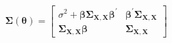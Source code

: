 \begin{equation}
	\boldsymbol{\Sigma} \left( \boldsymbol{\theta} \right)
	=
	\left[
		\begin{array}{c|c}
			\sigma^2 + \boldsymbol{\beta} \boldsymbol{\Sigma}_{\mathbf{X}, \mathbf{X}} \boldsymbol{\beta}^{\prime} & \boldsymbol{\beta}^{\prime} \boldsymbol{\Sigma}_{\mathbf{X}, \mathbf{X}} \\
			\hline
			\boldsymbol{\Sigma}_{\mathbf{X}, \mathbf{X}} \boldsymbol{\beta}                                        & \boldsymbol{\Sigma}_{\mathbf{X}, \mathbf{X}}                             
		\end{array}
	\right]
	\label{eq:strRegression-sigmacap-of-theta}
\end{equation}